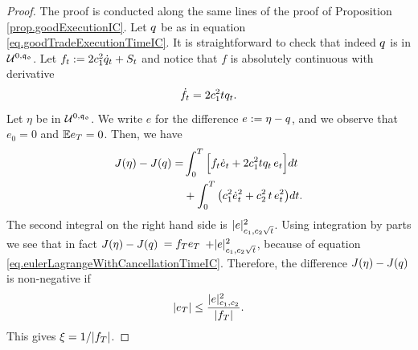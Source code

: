 \documentclass[10pt,a4paper]{article}
\begin{document}
	\begin{proof}
		The proof is conducted along the same lines of the proof of Proposition \ref{prop.goodExecutionIC}.
		Let $q$ be as in equation \eqref{eq.goodTradeExecutionTimeIC}. It is straightforward to check that indeed $q$ is in $\mathcal{U}^{0,\mathfrak{q_0}}$. 
		 Let $f_t:= 2c_{1}^{2} \dot{q}_{t} + S_t$ and notice that $f$ is absolutely continuous with derivative 
		\begin{equation}\label{eq.eulerLagrangeWithCancellationTimeIC}
		\dot{f}_t = 2 c_{1}^{2} t q_t .
		\end{equation}
		Let $\eta$ be in $\mathcal{U}^{0,\mathfrak{q_0}}$. We write $e$ for the difference $e:=\eta-q$, and we observe that $e_0=0$ and $\mathbb{{E}} e_T = 0$.  Then, we have 
		\begin{equation*}
		\begin{split}
		J(\eta) - J(q) = &
		\int_{0}^{T} \Big[ f_t \dot{e}_t + 2c_{1}^{2} t q_t \, e_t\Big]dt\\
		&+\int_{0}^{T}\big(c_{1}^{2} \dot{e}_t^{2} + c_{2}^{2} \, t \, e^{2}_t \big)dt.
		\end{split}
		\end{equation*}
		The second integral on the right hand side is $ \lvert e \rvert_{c_{1},c_{2}\sqrt{t}}^{2}$.  
		Using integration by parts we see that in fact $J(\eta) - J(q) $ $= f_T e_T $ $ + \lvert e \rvert_{c_{1},c_{2}\sqrt{t}}^{2}$, because of equation \eqref{eq.eulerLagrangeWithCancellationTimeIC}.  
		Therefore, the difference $J(\eta) - J(q) $ is non-negative if 
		\begin{equation*}
		\left\lvert {e_T} \right\rvert
		\leq \frac{ \lvert e \rvert_{c_{1},c_{2}}^{2}}{\left\lvert {f_T} \right\rvert}.
		\end{equation*}
		This gives $\xi = 1/\lvert f_T\rvert$.
		

\end{proof}
\end{document}
